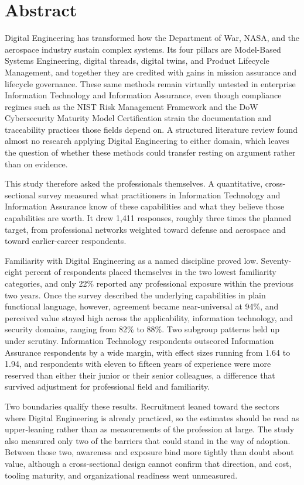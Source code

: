 \section{Abstract}
Digital Engineering has transformed how the Department of War, NASA, and the aerospace industry sustain complex systems. Its four pillars are Model-Based Systems Engineering, digital threads, digital twins, and Product Lifecycle Management, and together they are credited with gains in mission assurance and lifecycle governance. These same methods remain virtually untested in enterprise Information Technology and Information Assurance, even though compliance regimes such as the NIST Risk Management Framework and the DoW Cybersecurity Maturity Model Certification strain the documentation and traceability practices those fields depend on. A structured literature review found almost no research applying Digital Engineering to either domain, which leaves the question of whether these methods could transfer resting on argument rather than on evidence.

This study therefore asked the professionals themselves. A quantitative, cross-sectional survey measured what practitioners in Information Technology and Information Assurance know of these capabilities and what they believe those capabilities are worth. It drew 1{,}411 responses, roughly three times the planned target, from professional networks weighted toward defense and aerospace and toward earlier-career respondents.

Familiarity with Digital Engineering as a named discipline proved low. Seventy-eight percent of respondents placed themselves in the two lowest familiarity categories, and only 22\% reported any professional exposure within the previous two years. Once the survey described the underlying capabilities in plain functional language, however, agreement became near-universal at 94\%, and perceived value stayed high across the applicability, information technology, and security domains, ranging from 82\% to 88\%. Two subgroup patterns held up under scrutiny. Information Technology respondents outscored Information Assurance respondents by a wide margin, with effect sizes running from 1.64 to 1.94, and respondents with eleven to fifteen years of experience were more reserved than either their junior or their senior colleagues, a difference that survived adjustment for professional field and familiarity.

Two boundaries qualify these results. Recruitment leaned toward the sectors where Digital Engineering is already practiced, so the estimates should be read as upper-leaning rather than as measurements of the profession at large. The study also measured only two of the barriers that could stand in the way of adoption. Between those two, awareness and exposure bind more tightly than doubt about value, although a cross-sectional design cannot confirm that direction, and cost, tooling maturity, and organizational readiness went unmeasured.

